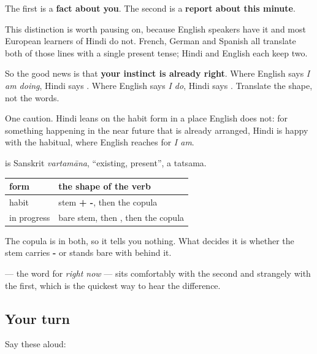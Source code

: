 The first is a \textbf{fact about you}. The second is a \textbf{report about this minute}.

\begin{cousinweb}
This distinction is worth pausing on, because English speakers have it and most European learners of Hindi do not. French, German and Spanish all translate both of those lines with a single present tense; Hindi and English each keep two.

So the good news is that \textbf{your instinct is already right}. Where English says \emph{I am doing}, Hindi says \emph{  }. Where English says \emph{I do}, Hindi says \emph{ }. Translate the shape, not the words.

One caution. Hindi leans on the habit form in a place English does not: for something happening in the near future that is already arranged, Hindi is happy with the habitual, where English reaches for \emph{I am}.

\textbf{} is Sanskrit \emph{vartamāna}, \textquotedblleft{}existing, present\textquotedblright{}, a tatsama.
\end{cousinweb}

\begin{grammarlens}[title={Grammar Lens: which word in the sentence tells you}]
\noindent
\begin{tabularx}{\linewidth}{@{}>{\raggedright\arraybackslash}X>{\raggedright\arraybackslash}X@{}}
\toprule
\textbf{form} & \textbf{the shape of the verb} \\
\midrule
habit & stem \textbf{+ -\hi{ता}}, then the copula \\
in progress & bare stem, then \textbf{\hi{रहा}}, then the copula \\
\bottomrule
\end{tabularx}

The copula is in both, so it tells you nothing. What decides it is whether the stem carries \textbf{-} or stands bare with \textbf{} behind it.

\textbf{} — the word for \emph{right now} — sits comfortably with the second and strangely with the first, which is the quickest way to hear the difference.
\end{grammarlens}

\subsection*{Your turn}
Say these aloud:

